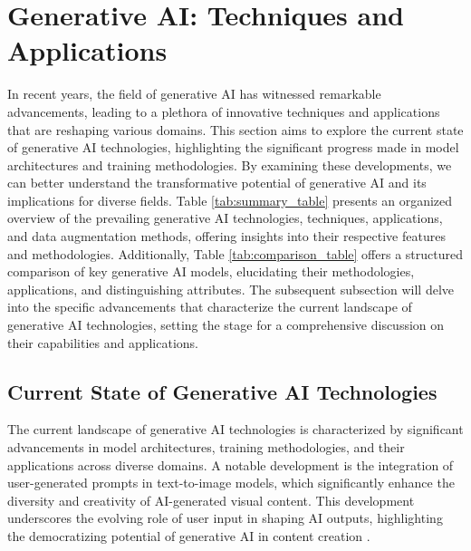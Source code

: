 \section{Generative AI: Techniques and Applications} \label{sec:Generative AI: Techniques and Applications}



In recent years, the field of generative AI has witnessed remarkable advancements, leading to a plethora of innovative techniques and applications that are reshaping various domains. This section aims to explore the current state of generative AI technologies, highlighting the significant progress made in model architectures and training methodologies. By examining these developments, we can better understand the transformative potential of generative AI and its implications for diverse fields. Table \ref{tab:summary_table} presents an organized overview of the prevailing generative AI technologies, techniques, applications, and data augmentation methods, offering insights into their respective features and methodologies. Additionally, Table \ref{tab:comparison_table} offers a structured comparison of key generative AI models, elucidating their methodologies, applications, and distinguishing attributes. The subsequent subsection will delve into the specific advancements that characterize the current landscape of generative AI technologies, setting the stage for a comprehensive discussion on their capabilities and applications.







\subsection{Current State of Generative AI Technologies} \label{subsec:Current State of Generative AI Technologies}

The current landscape of generative AI technologies is characterized by significant advancements in model architectures, training methodologies, and their applications across diverse domains. A notable development is the integration of user-generated prompts in text-to-image models, which significantly enhance the diversity and creativity of AI-generated visual content. This development underscores the evolving role of user input in shaping AI outputs, highlighting the democratizing potential of generative AI in content creation \cite{palmini2024patternscreativityuserinput}.



